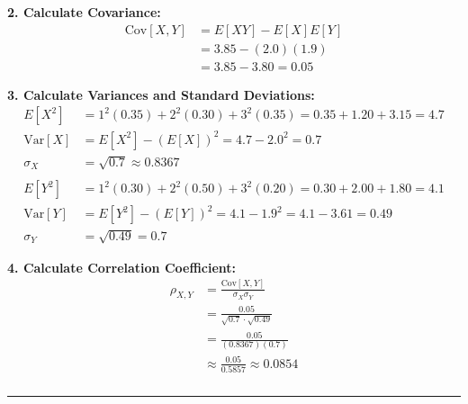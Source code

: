 \documentclass{article}
\begin{document}
\textbf{2. Calculate Covariance:}
\begin{align*}
    \text{Cov}[X, Y] &= E[XY] - E[X]E[Y] \\
                   &= 3.85 - (2.0)(1.9) \\
                   &= 3.85 - 3.80 = \mathbf{0.05}
\end{align*}

\textbf{3. Calculate Variances and Standard Deviations:}
\begin{align*}
    E[X^2] &= 1^2(0.35) + 2^2(0.30) + 3^2(0.35) = 0.35 + 1.20 + 3.15 = 4.7 \\
    \text{Var}[X] &= E[X^2] - (E[X])^2 = 4.7 - 2.0^2 = 0.7 \\
    \sigma_X &= \sqrt{0.7} \approx 0.8367 \\
    \\
    E[Y^2] &= 1^2(0.30) + 2^2(0.50) + 3^2(0.20) = 0.30 + 2.00 + 1.80 = 4.1 \\
    \text{Var}[Y] &= E[Y^2] - (E[Y])^2 = 4.1 - 1.9^2 = 4.1 - 3.61 = 0.49 \\
    \sigma_Y &= \sqrt{0.49} = 0.7
\end{align*}

\textbf{4. Calculate Correlation Coefficient:}
\begin{align*}
    \rho_{X, Y} &= \frac{\text{Cov}[X, Y]}{\sigma_X \sigma_Y} \\
               &= \frac{0.05}{\sqrt{0.7} \cdot \sqrt{0.49}} \\
               &= \frac{0.05}{(0.8367)(0.7)} \\
               &\approx \frac{0.05}{0.5857} \approx \mathbf{0.0854}
\end{align*}

\subsubsection*{}

\noindent\rule{\textwidth}{0.4pt}\\

\newpage
\end{document}
